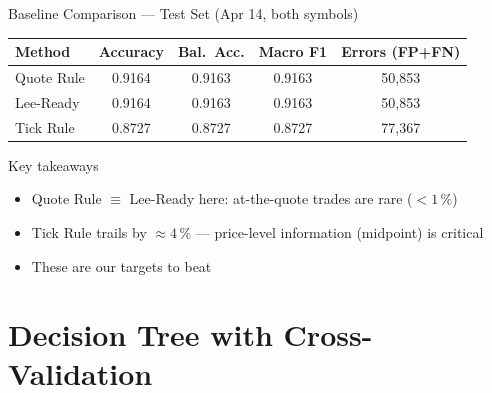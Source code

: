 \documentclass[aspectratio=169,10pt]{beamer}
\begin{document}
\begin{frame}{Baseline Comparison — Test Set (Apr 14, both symbols)}
  \begin{center}
  \begin{tabular}{lcccc}
    \toprule
    \textbf{Method} & \textbf{Accuracy} & \textbf{Bal.\ Acc.} & \textbf{Macro F1} & \textbf{Errors (FP+FN)} \\
    \midrule
    Quote Rule & 0.9164 & 0.9163 & 0.9163 & 50{,}853 \\
    Lee-Ready  & 0.9164 & 0.9163 & 0.9163 & 50{,}853 \\
    Tick Rule  & 0.8727 & 0.8727 & 0.8727 & 77{,}367 \\
    \bottomrule
  \end{tabular}
  \end{center}

  \medskip
  \begin{block}{Key takeaways}
    \begin{itemize}
      \item Quote Rule $\equiv$ Lee-Ready here: at-the-quote trades are rare ($< 1\,\%$)
      \item Tick Rule trails by $\approx 4\,\%$ — price-level information (midpoint) is critical
      \item These are our targets to beat
    \end{itemize}
  \end{block}
\end{frame}

\section{Decision Tree with Cross-Validation}
\end{document}
